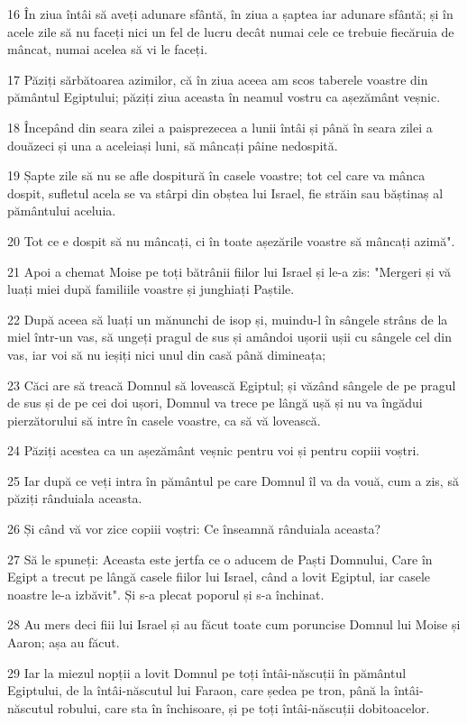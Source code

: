 \par 16 În ziua întâi să aveți adunare sfântă, în ziua a șaptea iar adunare sfântă; și în acele zile să nu faceți nici un fel de lucru decât numai cele ce trebuie fiecăruia de mâncat, numai acelea să vi le faceți.
\par 17 Păziți sărbătoarea azimilor, că în ziua aceea am scos taberele voastre din pământul Egiptului; păziți ziua aceasta în neamul vostru ca așezământ veșnic.
\par 18 Începând din seara zilei a paisprezecea a lunii întâi și până în seara zilei a douăzeci și una a aceleiași luni, să mâncați pâine nedospită.
\par 19 Șapte zile să nu se afle dospitură în casele voastre; tot cel care va mânca dospit, sufletul acela se va stârpi din obștea lui Israel, fie străin sau băștinaș al pământului aceluia.
\par 20 Tot ce e dospit să nu mâncați, ci în toate așezările voastre să mâncați azimă".
\par 21 Apoi a chemat Moise pe toți bătrânii fiilor lui Israel și le-a zis: "Mergeri și vă luați miei după familiile voastre și junghiați Paștile.
\par 22 După aceea să luați un mănunchi de isop și, muindu-l în sângele strâns de la miel într-un vas, să ungeți pragul de sus și amândoi ușorii ușii cu sângele cel din vas, iar voi să nu ieșiți nici unul din casă până dimineața;
\par 23 Căci are să treacă Domnul să lovească Egiptul; și văzând sângele de pe pragul de sus și de pe cei doi ușori, Domnul va trece pe lângă ușă și nu va îngădui pierzătorului să intre în casele voastre, ca să vă lovească.
\par 24 Păziți acestea ca un așezământ veșnic pentru voi și pentru copiii voștri.
\par 25 Iar după ce veți intra în pământul pe care Domnul îl va da vouă, cum a zis, să păziți rânduiala aceasta.
\par 26 Și când vă vor zice copiii voștri: Ce înseamnă rânduiala aceasta?
\par 27 Să le spuneți: Aceasta este jertfa ce o aducem de Paști Domnului, Care în Egipt a trecut pe lângă casele fiilor lui Israel, când a lovit Egiptul, iar casele noastre le-a izbăvit". Și s-a plecat poporul și s-a închinat.
\par 28 Au mers deci fiii lui Israel și au făcut toate cum poruncise Domnul lui Moise și Aaron; așa au făcut.
\par 29 Iar la miezul nopții a lovit Domnul pe toți întâi-născuții în pământul Egiptului, de la întâi-născutul lui Faraon, care ședea pe tron, până la întâi-născutul robului, care sta în închisoare, și pe toți întâi-născuții dobitoacelor.
